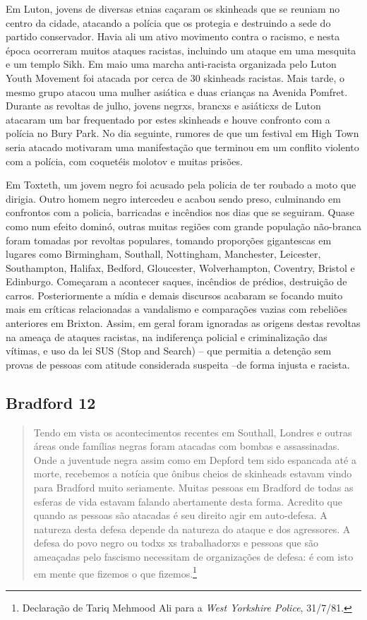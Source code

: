 Em Luton, jovens de diversas etnias caçaram os skinheads que se reuniam no centro da cidade, atacando a polícia que os protegia e destruindo a sede do partido conservador. Havia ali um ativo movimento contra o racismo, e nesta época ocorreram muitos ataques racistas, incluindo um ataque em uma mesquita e um templo Sikh. Em maio uma marcha anti-racista organizada pelo Luton Youth Movement foi atacada por cerca de 30 skinheads racistas. Mais tarde, o mesmo grupo atacou uma mulher asiática e duas crianças na Avenida Pomfret. Durante as revoltas de julho, jovens negrxs, brancxs e asiáticxs de Luton atacaram um bar frequentado por estes skinheads e houve confronto com a polícia no Bury Park. No dia seguinte, rumores de que um festival em High Town seria atacado motivaram uma manifestação que terminou em um conflito violento com a polícia, com coquetéis molotov e muitas prisões.

Em Toxteth, um jovem negro foi acusado pela policia de ter roubado a moto que dirigia. Outro homem negro intercedeu e acabou sendo preso, culminando em confrontos com a policia, barricadas e incêndios nos dias que se seguiram. Quase como num efeito dominó, outras muitas regiões com grande população não-branca foram tomadas por revoltas populares, tomando proporções gigantescas em lugares como Birmingham, Southall, Nottingham, Manchester, Leicester, Southampton, Halifax, Bedford, Gloucester, Wolverhampton, Coventry, Bristol e Edinburgo. Começaram a acontecer saques, incêndios de prédios, destruição de carros. Posteriormente a mídia e demais discursos acabaram se focando muito mais em críticas relacionadas a vandalismo e comparações vazias com rebeliões anteriores em Brixton. Assim, em geral foram ignoradas as origens destas revoltas na ameaça de ataques racistas, na indiferença policial e criminalização das vítimas, e uso da lei SUS (Stop and Search) – que permitia a detenção sem provas de pessoas com atitude considerada suspeita –de forma injusta e racista.

\subsection{Bradford 12}

\begin{quote}
Tendo em vista os acontecimentos recentes em Southall, Londres e outras áreas onde famílias negras foram atacadas com bombas e assassinadas. Onde a juventude negra assim como em Depford tem sido espancada até a morte, recebemos a notícia que ônibus cheios de skinheads estavam vindo para Bradford muito seriamente. Muitas pessoas em Bradford de todas as esferas de vida estavam falando abertamente desta forma. Acredito que quando as pessoas são atacadas é seu direito agir em auto-defesa. A natureza desta defesa depende da natureza do ataque e dos agressores. A defesa do povo negro ou todxs xs trabalhadorxs e pessoas que são ameaçadas pelo fascismo necessitam de organizações de defesa: é com isto em mente que fizemos o que fizemos.\footnote{Declaração de Tariq Mehmood Ali para a \textit{West Yorkshire Police}, 31/7/81.}
\end{quote}

